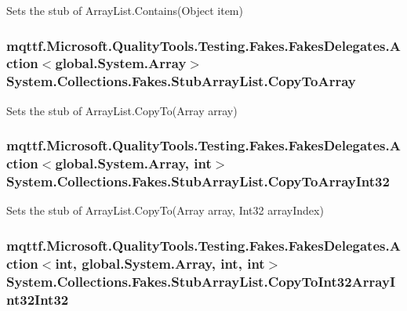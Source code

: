 Sets the stub of Array\-List.\-Contains(\-Object item)

\hypertarget{class_system_1_1_collections_1_1_fakes_1_1_stub_array_list_a24179e9300f981c0067977230d882fd2}{
\subsubsection[{Copy\-To\-Array}]{\setlength{\rightskip}{0pt plus 5cm}mqttf.\-Microsoft.\-Quality\-Tools.\-Testing.\-Fakes.\-Fakes\-Delegates.\-Action$<$global.\-System.\-Array$>$ System.\-Collections.\-Fakes.\-Stub\-Array\-List.\-Copy\-To\-Array}}\label{class_system_1_1_collections_1_1_fakes_1_1_stub_array_list_a24179e9300f981c0067977230d882fd2}


Sets the stub of Array\-List.\-Copy\-To(\-Array array)

\hypertarget{class_system_1_1_collections_1_1_fakes_1_1_stub_array_list_a3f4a90cb068aafa7e956635dc663135d}{
\subsubsection[{Copy\-To\-Array\-Int32}]{\setlength{\rightskip}{0pt plus 5cm}mqttf.\-Microsoft.\-Quality\-Tools.\-Testing.\-Fakes.\-Fakes\-Delegates.\-Action$<$global.\-System.\-Array, int$>$ System.\-Collections.\-Fakes.\-Stub\-Array\-List.\-Copy\-To\-Array\-Int32}}\label{class_system_1_1_collections_1_1_fakes_1_1_stub_array_list_a3f4a90cb068aafa7e956635dc663135d}


Sets the stub of Array\-List.\-Copy\-To(\-Array array, Int32 array\-Index)

\hypertarget{class_system_1_1_collections_1_1_fakes_1_1_stub_array_list_ac003ed605985617d10eb17f6e8ea144c}{
\subsubsection[{Copy\-To\-Int32\-Array\-Int32\-Int32}]{\setlength{\rightskip}{0pt plus 5cm}mqttf.\-Microsoft.\-Quality\-Tools.\-Testing.\-Fakes.\-Fakes\-Delegates.\-Action$<$int, global.\-System.\-Array, int, int$>$ System.\-Collections.\-Fakes.\-Stub\-Array\-List.\-Copy\-To\-Int32\-Array\-Int32\-Int32}}\label{class_system_1_1_collections_1_1_fakes_1_1_stub_array_list_ac003ed605985617d10eb17f6e8ea144c}


